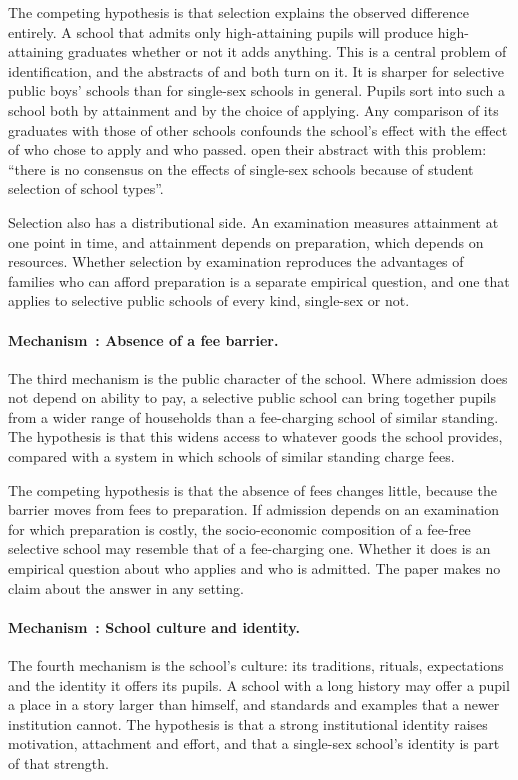 \documentclass[11pt]{article}
\newcommand{\srcq}[2]{``#2''}
\newcounter{mech}
\newcommand{\mech}[1]{\refstepcounter{mech}\paragraph{Mechanism~\themech: #1.}}
\begin{document}
The competing hypothesis is that selection explains the observed difference entirely. A school that admits only high-attaining pupils will produce high-attaining graduates whether or not it adds anything. This is a central problem of identification, and the abstracts of \citet{park2012} and \citet{pahlke2014} both turn on it. It is sharper for selective public boys' schools than for single-sex schools in general. Pupils sort into such a school both by attainment and by the choice of applying. Any comparison of its graduates with those of other schools confounds the school's effect with the effect of who chose to apply and who passed. \citet{park2012} open their abstract with this problem: \srcq{park2012}{there is no consensus on the effects of single-sex schools because of student selection of school types}.

Selection also has a distributional side. An examination measures attainment at one point in time, and attainment depends on preparation, which depends on resources. Whether selection by examination reproduces the advantages of families who can afford preparation is a separate empirical question, and one that applies to selective public schools of every kind, single-sex or not.

\mech{Absence of a fee barrier}\label{mech:fees}
The third mechanism is the public character of the school. Where admission does not depend on ability to pay, a selective public school can bring together pupils from a wider range of households than a fee-charging school of similar standing. The hypothesis is that this widens access to whatever goods the school provides, compared with a system in which schools of similar standing charge fees.

The competing hypothesis is that the absence of fees changes little, because the barrier moves from fees to preparation. If admission depends on an examination for which preparation is costly, the socio-economic composition of a fee-free selective school may resemble that of a fee-charging one. Whether it does is an empirical question about who applies and who is admitted. The paper makes no claim about the answer in any setting.

\mech{School culture and identity}\label{mech:culture}
The fourth mechanism is the school's culture: its traditions, rituals, expectations and the identity it offers its pupils. A school with a long history may offer a pupil a place in a story larger than himself, and standards and examples that a newer institution cannot. The hypothesis is that a strong institutional identity raises motivation, attachment and effort, and that a single-sex school's identity is part of that strength.
\end{document}
